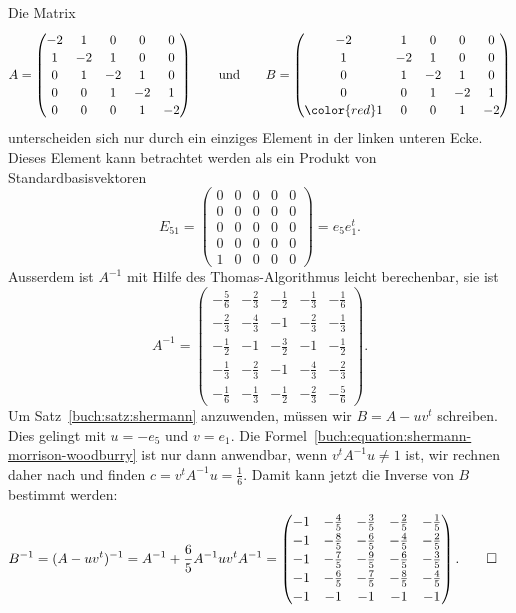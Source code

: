 \begin{beispiel}
Die Matrix
\[
A
=
\begin{pmatrix}
-2& 1& 0& 0& 0\\
 1&-2& 1& 0& 0\\
 0& 1&-2& 1& 0\\
 0& 0& 1&-2& 1\\
 0& 0& 0& 1&-2
\end{pmatrix}
\qquad
\text{und}
\qquad
B
=
\begin{pmatrix}
-2& 1& 0& 0& 0\\
 1&-2& 1& 0& 0\\
 0& 1&-2& 1& 0\\
 0& 0& 1&-2& 1\\
{\color{red} 1}& 0& 0& 1&-2
\end{pmatrix}
\]
unterscheiden sich nur durch ein einziges Element in der linken unteren
Ecke.
Dieses Element kann betrachtet werden als ein Produkt von
Standardbasisvektoren
%
\[
E_{51}
=
\begin{pmatrix}
 0& 0& 0& 0& 0\\
 0& 0& 0& 0& 0\\
 0& 0& 0& 0& 0\\
 0& 0& 0& 0& 0\\
 1& 0& 0& 0& 0
\end{pmatrix}
=
e_5e_1^t.
\]
Ausserdem ist $A^{-1}$ mit Hilfe des Thomas-Algorithmus leicht berechenbar,
%
sie ist
\[
\renewcommand\arraystretch{1.15}
A^{-1}
= 
\begin{pmatrix}
-\frac56 & -\frac23 & -\frac12 & -\frac13 & -\frac16 \\
-\frac23 & -\frac43 & -1       & -\frac23 & -\frac13 \\
-\frac12 & -1       & -\frac32 & -1       & -\frac12 \\
-\frac13 & -\frac23 & -1       & -\frac43 & -\frac23 \\
-\frac16 & -\frac13 & -\frac12 & -\frac23 & -\frac56
\end{pmatrix}.
\]
Um Satz~\ref{buch:satz:shermann} anzuwenden, müssen wir $B=A-uv^t$ schreiben.
Dies gelingt mit $u=-e_5$ und $v=e_1$.
Die Formel~\eqref{buch:equation:shermann-morrison-woodburry} ist nur dann
anwendbar, wenn $v^tA^{-1}u\ne 1$ ist, wir rechnen daher nach und finden
$c=v^tA^{-1}u=\frac16$.
Damit kann jetzt die Inverse von $B$ bestimmt werden:
\begin{align*}
B^{-1}
&=
(A-uv^t)^{-1}
=
A^{-1} + \frac65 A^{-1}uv^tA^{-1}
=
\renewcommand\arraystretch{1.15}
\begin{pmatrix}
-1& -\frac45 & -\frac35 & -\frac25 & -\frac15 \\
-1& -\frac85 & -\frac65 & -\frac45 & -\frac25 \\
-1& -\frac75 & -\frac95 & -\frac65 & -\frac35 \\
-1& -\frac65 & -\frac75 & -\frac85 & -\frac45 \\
-1& -1       & -1       & -1       & -1       
\end{pmatrix}.
\qedhere
\end{align*}
\end{beispiel}


